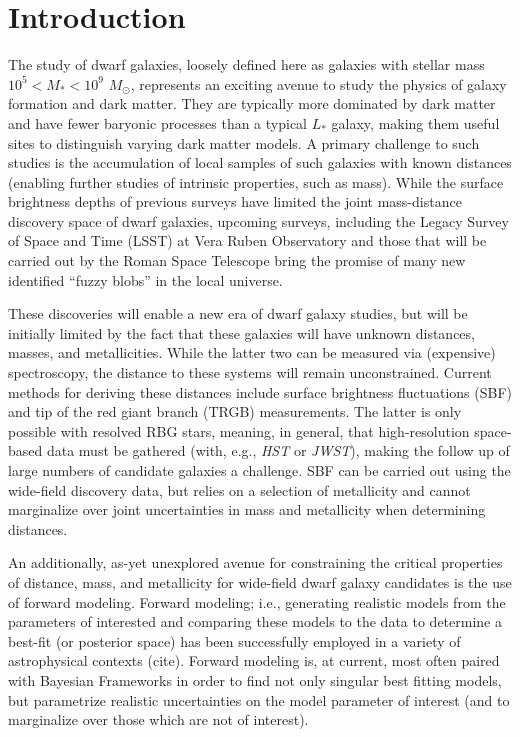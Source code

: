 \documentclass[twocolumn]{aastex631}
\begin{document}



\section{Introduction} \label{sec:intro}

The study of dwarf galaxies, loosely defined here as galaxies with stellar mass $10^5<M_{*}<10^9$ $M_{\odot}$, represents an exciting avenue to study the physics of galaxy formation and dark matter. They are typically more dominated by dark matter and have fewer baryonic processes than a typical $L_{*}$ galaxy, making them useful sites to distinguish varying dark matter models. A primary challenge to such studies is the accumulation of local samples of such galaxies with known distances (enabling further studies of intrinsic properties, such as mass). While the surface brightness depths of previous surveys have limited the joint mass-distance discovery space of dwarf galaxies, upcoming surveys, including the Legacy Survey of Space and Time (LSST) at Vera Ruben Observatory and those that will be carried out by the Roman Space Telescope bring the promise of many new identified ``fuzzy blobs'' in the local universe. 

These discoveries will enable a new era of dwarf galaxy studies, but will be initially limited by the fact that these galaxies will have unknown distances, masses, and metallicities. While the latter two can be measured via (expensive) spectroscopy, the distance to these systems will remain unconstrained. Current methods for deriving these distances include surface brightness fluctuations (SBF) and tip of the red giant branch (TRGB) measurements. The latter is only possible with resolved RBG stars, meaning, in general, that high-resolution space-based data must be gathered (with, e.g., \textit{HST} or \textit{JWST}), making the follow up of large numbers of candidate galaxies a challenge. SBF can be carried out using the wide-field discovery data, but relies on a selection of metallicity and cannot marginalize over joint uncertainties in mass and metallicity when determining distances.

An additionally, as-yet unexplored avenue for constraining the critical properties of distance, mass, and metallicity for wide-field dwarf galaxy candidates is the use of forward modeling. Forward modeling; i.e., generating realistic models from the parameters of interested and comparing these models to the data to determine a best-fit (or posterior space) has been successfully employed in a variety of astrophysical contexts (cite). Forward modeling is, at current, most often paired with Bayesian Frameworks in order to find not only singular best fitting models, but parametrize realistic uncertainties on the model parameter of interest (and to marginalize over those which are not of interest).
\end{document}
